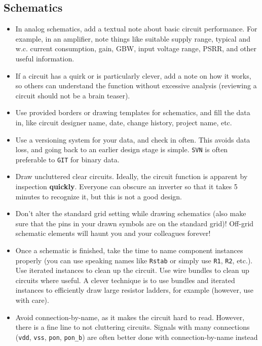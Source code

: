 \documentclass[
  a4paper,
  DIV=11,
  numbers=noendperiod]{scrartcl}
\providecommand{\tightlist}{%
  \setlength{\itemsep}{0pt}\setlength{\parskip}{0pt}}\usepackage{longtable,booktabs,array}
\begin{document}
\subsection{Schematics}\label{schematics}

\begin{itemize}
\tightlist
\item
  In analog schematics, add a textual note about basic circuit
  performance. For example, in an amplifier, note things like suitable
  supply range, typical and w.c. current consumption, gain, GBW, input
  voltage range, PSRR, and other useful information.
\item
  If a circuit has a quirk or is particularly clever, add a note on how
  it works, so others can understand the function without excessive
  analysis (reviewing a circuit should not be a brain teaser).
\item
  Use provided borders or drawing templates for schematics, and fill the
  data in, like circuit designer name, date, change history, project
  name, etc.
\item
  Use a versioning system for your data, and check in often. This avoids
  data loss, and going back to an earlier design stage is simple.
  \texttt{SVN} is often preferable to \texttt{GIT} for binary data.
\item
  Draw uncluttered clear circuits. Ideally, the circuit function is
  apparent by inspection \textbf{quickly}. Everyone can obscure an
  inverter so that it takes 5 minutes to recognize it, but this is not a
  good design.
\item
  Don't alter the standard grid setting while drawing schematics (also
  make sure that the pins in your drawn symbols are on the standard
  grid)! Off-grid schematic elements will haunt you and your colleagues
  forever!
\item
  Once a schematic is finished, take the time to name component
  instances properly (you can use speaking names like \texttt{Rstab} or
  simply use \texttt{R1}, \texttt{R2}, etc.). Use iterated instances to
  clean up the circuit. Use wire bundles to clean up circuits where
  useful. A clever technique is to use bundles and iterated instances to
  efficiently draw large resistor ladders, for example (however, use
  with care).
\item
  Avoid connection-by-name, as it makes the circuit hard to read.
  However, there is a fine line to not cluttering circuits. Signals with
  many connections (\texttt{vdd}, \texttt{vss}, \texttt{pon},
  \texttt{pon\_b}) are often better done with connection-by-name instead

\end{itemize}
\end{document}
